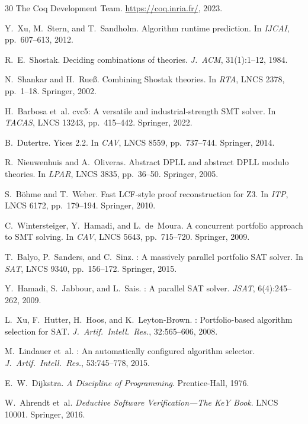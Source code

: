 \documentclass[11pt]{article}
\begin{document}
\begin{thebibliography}{30}
The {Coq} Development Team. \url{https://coq.inria.fr/}, 2023.

Y.~Xu, M.~Stern, and T.~Sandholm.
\newblock Algorithm runtime prediction.
\newblock In \emph{IJCAI}, pp.~607--613, 2012.

R.~E.~Shostak.
\newblock Deciding combinations of theories.
\newblock \emph{J.\ ACM}, 31(1):1--12, 1984.

N.~Shankar and H.~Rue{\ss}.
\newblock Combining Shostak theories.
\newblock In \emph{RTA}, LNCS 2378, pp.~1--18. Springer, 2002.

H.~Barbosa et~al.
\newblock cvc5: A versatile and industrial-strength SMT solver.
\newblock In \emph{TACAS}, LNCS 13243, pp.~415--442. Springer, 2022.

B.~Dutertre.
\newblock Yices 2.2.
\newblock In \emph{CAV}, LNCS 8559, pp.~737--744. Springer, 2014.

R.~Nieuwenhuis and A.~Oliveras.
\newblock Abstract {DPLL} and abstract {DPLL} modulo theories.
\newblock In \emph{LPAR}, LNCS 3835, pp.~36--50. Springer, 2005.

S.~B\"ohme and T.~Weber.
\newblock Fast {LCF}-style proof reconstruction for {Z3}.
\newblock In \emph{ITP}, LNCS 6172, pp.~179--194. Springer, 2010.

C.~Wintersteiger, Y.~Hamadi, and L.~de~Moura.
\newblock A concurrent portfolio approach to {SMT} solving.
\newblock In \emph{CAV}, LNCS 5643, pp.~715--720. Springer, 2009.

T.~Balyo, P.~Sanders, and C.~Sinz.
: A massively parallel portfolio {SAT} solver.
\newblock In \emph{SAT}, LNCS 9340, pp.~156--172. Springer, 2015.

Y.~Hamadi, S.~Jabbour, and L.~Sais.
: A parallel {SAT} solver.
\newblock \emph{JSAT}, 6(4):245--262, 2009.

L.~Xu, F.~Hutter, H.~Hoos, and K.~Leyton-Brown.
: Portfolio-based algorithm selection for {SAT}.
\newblock \emph{J.\ Artif.\ Intell.\ Res.}, 32:565--606, 2008.

M.~Lindauer et~al.
: An automatically configured algorithm selector.
\newblock \emph{J.\ Artif.\ Intell.\ Res.}, 53:745--778, 2015.

E.~W.~Dijkstra.
\newblock \emph{A Discipline of Programming}.
\newblock Prentice-Hall, 1976.

W.~Ahrendt et~al.
\newblock \emph{Deductive Software Verification---The KeY Book}.
\newblock LNCS 10001. Springer, 2016.

\end{thebibliography}
\end{document}
